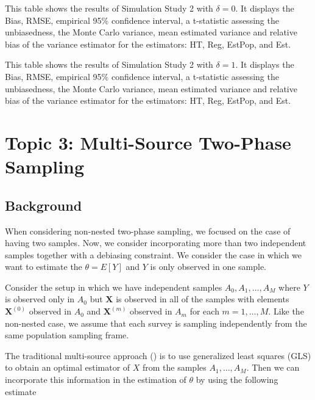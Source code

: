\documentclass[12pt]{article}
\renewcommand{\bf}[1]{\mathbf{#1}}
\begin{document}
\begin{table}[ht!]
  \centering
  
\caption{This table shows the results of Simulation Study 2 with $\delta = 0$.
  It displays the Bias, RMSE, empirical 95\% confidence interval, a t-statistic
  assessing the unbiasedness, the Monte Carlo variance, mean estimated variance
  and relative bias of the variance estimator for the estimators: HT, Reg,
  EstPop, and Est.}
\label{tab:nndc0-mean}
\end{table}

\begin{table}[ht!]
  \centering
  
\caption{This table shows the results of Simulation Study 2 with $\delta = 1$.
  It displays the Bias, RMSE, empirical 95\% confidence interval, a t-statistic
  assessing the unbiasedness, the Monte Carlo variance, mean estimated variance
  and relative bias of the variance estimator for the estimators: HT, Reg,
  EstPop, and Est.}
\label{tab:nndc1-mean}
\end{table}

\section{Topic 3: Multi-Source Two-Phase Sampling}

\subsection{Background}

When considering non-nested two-phase sampling, we focused on the case of having
two samples. Now, we consider incorporating more than two independent samples
together with a debiasing constraint. We consider the case in which we
want to estimate the $\theta = E[Y]$ and $Y$ is only observed in one sample.

Consider the setup in which we have independent samples $A_0, A_1, \dots, A_M$
where $Y$ is observed only in $A_0$ but $\bf X$ is observed in all of the
samples with elements $\bf X^{(0)}$ observed in $A_0$ and $\bf X^{(m)}$ observed
in $A_m$ for each $m = 1, \dots, M$. Like the non-nested case, we assume that
each survey is sampling independently from the same population sampling frame.

The traditional multi-source approach (\cite{kim2024statistics}) is to use
generalized least squares (GLS) to obtain an optimal estimator of $X$ from the
samples $A_1, \dots, A_M$. Then we can incorporate this information in the
estimation of $\theta$ by using the following estimate 
\end{document}
